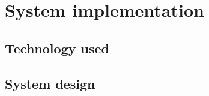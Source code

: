 \chapter{System implementation} \label{chap:System_implementation}
\minitoc

\section{Technology used}

\section{System design}
